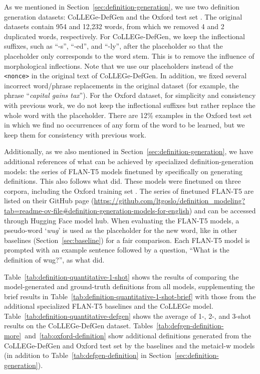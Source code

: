\documentclass{article}
\begin{document}
As we mentioned in Section~\ref{sec:definition-generation}, we use two definition generation datasets: CoLLEGe-DefGen \citep{Teehan2024CoLLEGeCE} and the Oxford test set \citep{gadetsky-etal-2018-conditional}.
The original datasets contain 954 and 12,232 words, from which we removed 4 and 2 duplicated words, respectively.
For CoLLEGe-DefGen, we keep the inflectional suffixes, such as ``-s'', ``-ed'', and ``-ly'', after the placeholder so that the placeholder only corresponds to the word stem. This is to remove the influence of morphological inflections.
Note that we use our placeholders instead of the \texttt{<nonce>} in the original text of CoLLEGe-DefGen.
In addition, we fixed several incorrect word/phrase replacements in the original dataset (for example, the phrase ``\emph{capital gains tax}'').
For the Oxford dataset, for simplicity and consistency with previous work, we do not keep the inflectional suffixes but rather replace the whole word with the placeholder.
There are 12\% examples in the Oxford test set in which we find no occurrences of any form of the word to be learned, but we keep them for consistency with previous work.

Additionally, as we also mentioned in Section~\ref{sec:definition-generation}, we have additional references of what can be achieved by specialized definition-generation models: the series of \mbox{FLAN-T5} \citep{chung2024scaling} models finetuned by \citet{giulianelli-etal-2023-interpretable} specifically on generating definitions.
This also follows what \citet{Teehan2024CoLLEGeCE} did.
These models were finetuned on three corpora, including the Oxford training set \citep{gadetsky-etal-2018-conditional}.
The series of finetuned \mbox{FLAN-T5} are listed on their GitHub page (\url{https://github.com/ltgoslo/definition_modeling?tab=readme-ov-file#definition-generation-models-for-english}) and can be accessed through Hugging Face model hub.
When evaluating the \mbox{FLAN-T5} models, a pseudo-word `\textit{wug}' is used as the placeholder for the new word, like in other baselines (Section~\ref{sec:baseline}) for a fair comparison. Each \mbox{FLAN-T5} model is prompted with an example sentence followed by a question, ``What is the definition of wug?'', as what \citet{giulianelli-etal-2023-interpretable} did.

Table~\ref{tab:definition-quantitative-1-shot} shows the results of comparing the model-generated and ground-truth definitions from all models, supplementing the brief results in Table~\ref{tab:definition-quantitative-1-shot-brief} with those from the additional specialized \mbox{FLAN-T5} baselines and the CoLLEGe model.
Table~\ref{tab:definition-quantitative-defgen} shows the average of 1-, 2-, and 3-shot results on the CoLLEGe-DefGen dataset.
Tables~\ref{tab:defgen-definition-more}~and~\ref{tab:oxford-definition} show additional definitions generated from the CoLLEGe-DefGen and Oxford test set by the baselines and the \ac{metaicl-w} models (in addition to Table~\ref{tab:defgen-definition} in Section~\ref{sec:definition-generation}).
\end{document}
